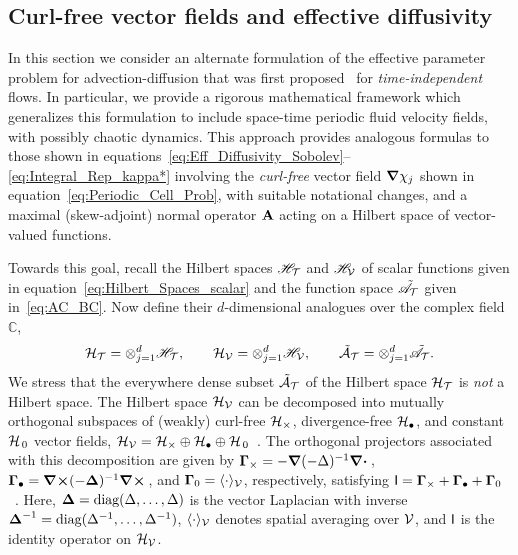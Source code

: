\documentclass[amsa]{ipart}
\begin{document}
\subsection{Curl-free vector fields and effective diffusivity}
\label{app:Curl_Free_Fields}
%
In this section we consider an alternate formulation of the effective
parameter problem for advection-diffusion that was first
proposed~\cite{Avellaneda:PRL-753,Avellaneda:CMP-339} for
\emph{time-independent} flows. In particular, we provide a rigorous
mathematical framework 
which generalizes this formulation to include space-time periodic fluid
velocity fields, with possibly chaotic dynamics.  This approach
provides analogous formulas to those shown in
equations~\eqref{eq:Eff_Diffusivity_Sobolev}--\eqref{eq:Integral_Rep_kappa*}
involving the \emph{curl-free} vector field $\mbox{\boldmath${\nabla}$}\chi_j$ shown in 
equation~\eqref{eq:Periodic_Cell_Prob}, with suitable notational
changes, and a maximal (skew-adjoint) 
normal operator $\mathbf{A}$ acting on a Hilbert space of vector-valued
functions.   







Towards this goal, recall the Hilbert spaces $\mathscr{H}_{\mathcal{T}}$ and
$\mathscr{H}_{\mathcal{V}}$ of scalar functions given in
equation~\eqref{eq:Hilbert_Spaces_scalar} and the function space 
$\tilde{\mathscr{A}}_{\mathcal{T}}$ given in~\eqref{eq:AC_BC}.
Now define
their $d$-dimensional analogues over the complex field $\mathbb{C}$,  
%
\begin{align}\label{eq:Hilbert_Spaces_vector}
  \Hc_{\Tc}=\otimes_{j=1}^d\Hs_{\Tc}, \qquad
  \Hc_{\Vc}=\otimes_{j=1}^d\Hs_{\Vc}, \qquad
  \tilde{\Ac}_{\Tc}=\otimes_{j=1}^d\tilde{\As}_{\Tc}.  
\end{align}
%
We stress that the everywhere dense subset $\tilde{\mathcal{A}}_{\mathcal{T}}$ of
the Hilbert space $\mathcal{H}_{\mathcal{T}}$ is \emph{not} a Hilbert space.  
The Hilbert space $\mathcal{H}_{\mathcal{V}}$ can be decomposed into mutually
orthogonal subspaces of (weakly) curl-free 
$\mathcal{H}_\times$, divergence-free $\mathcal{H}_\bullet$, and constant $\mathcal{H}_{\,0}$ vector fields,
$\mathcal{H}_{\mathcal{V}}=\mathcal{H}_\times\oplus\mathcal{H}_\bullet\oplus\mathcal{H}_{\,0}$~\cite{Fannjiang:1994:SIAM_JAM:333,Milton:2002:TC}. The orthogonal projectors 
associated with this decomposition are given by
$\mbox{\boldmath${\Gamma}$}_\times=-\mbox{\boldmath${\nabla}$}(-\Delta)^{-1}\mbox{\boldmath${\nabla}$} \mbox{\boldmath${\cdot}$}\,$,
$\mbox{\boldmath${\Gamma}$}_\bullet=\mbox{\boldmath${\nabla}$}\mbox{\boldmath${\times}$}(-\mbox{\boldmath${\Delta}$})^{-1}\mbox{\boldmath${\nabla}$} \mbox{\boldmath${\times}$}\,$, and 
$\mbox{\boldmath${\Gamma}$}_0=\langle\cdot\rangle_{\mathcal{V}}$,  respectively, satisfying
$\mathsf{I}=\mbox{\boldmath${\Gamma}$}_\times+\mbox{\boldmath${\Gamma}$}_\bullet+\mbox{\boldmath${\Gamma}$}_0$~\cite{Fannjiang:1994:SIAM_JAM:333,Novikov:2005:CPAM:867,Milton:2002:TC}. Here, 
$\mbox{\boldmath${\Delta}$}=\text{diag}(\Delta,\ldots,\Delta)$ is the vector Laplacian with inverse
$\mbox{\boldmath${\Delta}$}^{-1}=\text{diag}(\Delta^{-1},\ldots,\Delta^{-1})$, $\langle\cdot\rangle_{\mathcal{V}}$ denotes
spatial averaging over $\mathcal{V}$, and $\mathsf{I}$ is the identity
operator on $\mathcal{H}_{\mathcal{V}}$.
\end{document}
